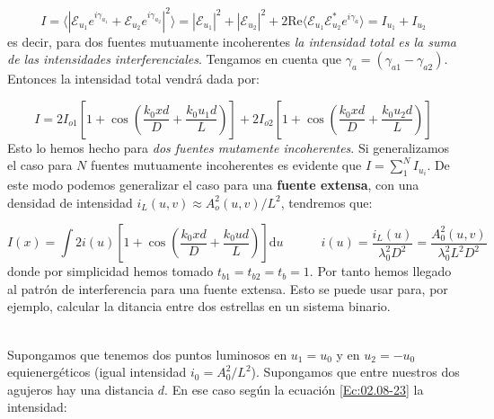 \documentclass[12pt,a4paper]{book}
\numberwithin{equation}{section}
\numberwithin{figure}{section}
\newcommand{\tquad}{\quad \quad \quad}
\newcommand{\parentesis}[1]{\left( #1  \right)}
\newcommand{\ccorchetes}[1]{\left[ #1  \right]}
\newcommand{\D}{\mathrm{d}}
\newcommand{\1}{_{(1)}}
\newcommand{\2}{_{(2)}}
\newcommand{\Real}{\mathrm{Re} }
\newcommand{\Encal}{\boldsymbol{\mathcal{E}}}
\theoremstyle{definition}
\begin{document}
\begin{equation}
I = \langle | \Encal_{u_1} e^{i \gamma_{a_1}} + \Encal_{u_2} e^{i \gamma_{a_2}} |^2 \rangle = |\mathcal{E}_{u_1}|^2 + |\mathcal{E}_{u_2}|^2 + 2 \Real \langle \mathcal{E}_{u_1} \mathcal{E}_{u_2}^* e^{i \gamma_a} \rangle = I_{u_1} + I_{u_2}
\end{equation}
es decir, para dos fuentes mutuamente incoherentes \textit{la intensidad total es la suma de las intensidades interferenciales}. Tengamos en cuenta que $\gamma_a=(\gamma_{a1} - \gamma_{a2})$. Entonces la intensidad total vendrá dada por:

\begin{equation}
I = 2 I_{o1} \ccorchetes{ 1 + \cos \parentesis{\frac{k_0 xd}{D} + \frac{k_0 u_1 d}{L}}} + 2 I_{o2} \ccorchetes{ 1 + \cos \parentesis{\frac{k_0 xd}{D} + \frac{k_0 u_2 d}{L}}} \label{Ec:02.08-23}
\end{equation}
Esto lo hemos hecho para \textit{dos fuentes mutamente incoherentes}. Si generalizamos el caso para $N$ fuentes mutuamente incoherentes es evidente que $I=\sum_1^N I_{u_i}$. De este modo podemos generalizar el caso para una \textbf{fuente extensa}, con una densidad de intensidad $i_L (u,v) \approx A_o^2 (u,v) /L^2$, tendremos que:

\begin{equation}
I(x) = \int 2 i(u) \ccorchetes{ 1 + \cos \parentesis{\frac{k_0 xd}{D} + \frac{k_0  ud }{L}}} \D u \tquad i(u) =  \frac{i_L (u)}{\lambda_ 0^2 D^2} = \frac{A_0^2(u,v)}{\lambda_0^2 L^2 D^2}
\end{equation}
donde por simplicidad hemos tomado $t_{b1} = t_{b2} = t_b = 1$. Por tanto hemos llegado al patrón de interferencia para una fuente extensa. Esto se puede usar para, por ejemplo, calcular la ditancia entre dos estrellas en un sistema binario. \\


\hrulefill \\

Supongamos que tenemos dos puntos luminosos en $u_1=u_0$ y en $u_2=-u_0$ equienergéticos (igual intensidad $i_0 = A_0^2/L^2$). Supongamos que entre nuestros dos agujeros hay una distancia $d$. En ese caso según la ecuación \ref{Ec:02.08-23} la intensidad:
\end{document}
